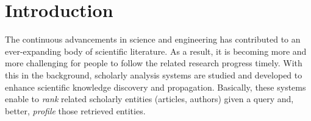 \section{Introduction}
\label{sec-intro}




The continuous advancements in science and engineering has contributed to an ever-expanding body of scientific literature.
As a result, it is becoming more and more challenging for people to follow the related research progress timely.
With this in the background, scholarly analysis systems are studied and developed to enhance scientific knowledge discovery and propagation. Basically, these systems enable to {\em rank} related scholarly entities (\eg articles, authors) given a query and, better, {\em profile} those retrieved entities.






